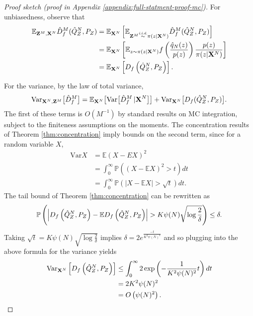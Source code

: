 \begin{proof}[Proof sketch (proof in Appendix \ref{appendix:full-statment-proof-mc})]
For unbiasedness, observe that
\begin{align*}
    \mathbb{E}_{\mathbf{Z}^M, \mathbf{X}^N} \hat{D}^M_f( \hat{Q}_Z^N , P_Z)
    &=\mathbb{E}_{\mathbf{X}^N} \left[ \mathbb{E}_{\mathbf{Z}^M \overset{\text{\emph{i.i.d.}}}{\sim} \pi(z | \mathbf{X}^N)} \hat{D}^M_f( \hat{Q}_Z^N , P_Z)\right] \\
    &= \mathbb{E}_{\mathbf{X}^N} \left[ \mathbb{E}_{z \sim \pi(z | \mathbf{X}^N)} f\left(\frac{\hat{q}_N(z)}{p(z)} \right) \frac{p(z)}{\pi(z|\mathbf{X}^N)} \right] \\
    &=\mathbb{E}_{\mathbf{X}^N} \left[ D_f\left( \hat{Q}^N_Z , P_Z \right)\right].
\end{align*}

For the variance, by the law of total variance,
\begin{align*}
    \text{Var}_{\mathbf{X}^N, \mathbf{Z}^M} \bigl[\hat{D}^M_f\bigr] = 
    \mathbb{E}_{\mathbf{X}^N} \bigl[\text{Var}\bigl[\hat{D}^M_f\, | \mathbf{X}^N\bigr]\bigr] + \text{Var}_{\mathbf{X}^N} \bigl[D_f( \hat{Q}_Z^N , P_Z )\bigr].
\end{align*}
The first of these terms is ${O( M^{-1})}$ by standard results on MC integration, subject to the finiteness assumptions on the moments.
The concentration results of Theorem \ref{thm:concentration} imply bounds on the second term, since for a random variable $X$,
\begin{align*}
    \text{Var}X &= \mathbb{E} (X - EX)^2 \\
    &= \int_0^\infty \mathbb{P}\left( (X - \mathbb{E} X)^2 > t \right) dt \\
    &= \int_0^\infty \mathbb{P} \left( \left| X - \mathbb{E} X \right| > \sqrt{t} \right) dt.
\end{align*}
The tail bound of Theorem \ref{thm:concentration} can be rewritten as 
\begin{align*}
\mathbb{P}\left(\left|D_f\left( \hat{Q}^N_Z , P_Z \right) - \mathbb{E} D_f\left( \hat{Q}^N_Z , P_Z \right) \right| > K\psi(N) \sqrt{\log \frac{2}{\delta}} \right) \leq \delta.
\end{align*}
Taking $\sqrt{t} = K\psi(N) \sqrt{\log \frac{2}{\delta}}$ implies $\delta = 2 e^{\frac{-t}{K^2 \psi(N)^2}}$ and so plugging into the above formula for the variance yields
\begin{align*}
    \text{Var}_{\mathbf{X}^N} \left[D_f\left( \hat{Q}^N_Z , P_Z \right)\right] 
    &\leq \int_0^\infty 2 \exp\left( -\frac{1}{K^2\psi(N)^2}t \right) dt\\
    &= 2 K^2 \psi(N)^2\\
    &= O\left(\psi(N)^2 \right).
\end{align*}
%
%
\end{proof}

